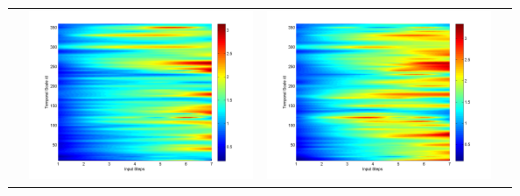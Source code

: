 \documentclass[11pt]{article}
\begin{document}
\begin{table}[H]
{\begin{tabular}{c  c   c   c  }
&\begin{minipage}{.3\textwidth}\includegraphics[width=\linewidth]{resultgraph/06914000pep.png}\end{minipage}
&\begin{minipage}{.3\textwidth}\includegraphics[width=\linewidth]{resultgraph/06914000pepq.png}\end{minipage}
\\

\end{tabular}}
\end{table}
\end{document}
